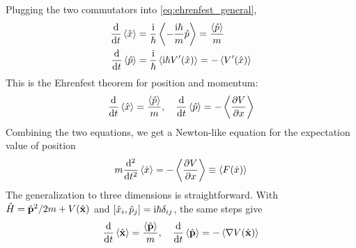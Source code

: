 Plugging the two commutators into \cref{eq:ehrenfest_general},
\begin{align*}
    \ddx{t} \mean{\ox} &= \frac{\ii}{\hbar} \mean{- \frac{\ii \hbar}{m} \op} = \frac{\mean{\op}}{m} \\
    \ddx{t} \mean{\op} &= \frac{\ii}{\hbar} \mean{\ii \hbar V'(\ox)} = - \mean{V'(\ox)}
\end{align*}
This is the Ehrenfest theorem for position and momentum:
\begin{align}
    \ddx{t} \mean{\ox} = \frac{\mean{\op}}{m}, \quad \ddx{t} \mean{\op} = - \mean{\pdv{V}{x}} \label{eq:ehrenfest_xp}
\end{align}
Combining the two equations, we get a Newton-like equation for the expectation value of position
\begin{align}
    m \ddxx{}{t} \mean{\ox} = - \mean{\pdv{V}{x}} \equiv \mean{F(\ox)} \label{eq:ehrenfest_newton}
\end{align}
The generalization to three dimensions is straightforward. With $\oH = \hat{\bfvec{p}}^2 / 2m + V(\hat{\bfvec{x}})$ and $\comm{\ox_i}{\op_j} = \ii \hbar \delta_{ij}$, the same steps give
\begin{align*}
    \ddx{t} \mean{\hat{\bfvec{x}}} = \frac{\mean{\hat{\bfvec{p}}}}{m}, \quad \ddx{t} \mean{\hat{\bfvec{p}}} = - \mean{\nabla V(\hat{\bfvec{x}})}
\end{align*}

